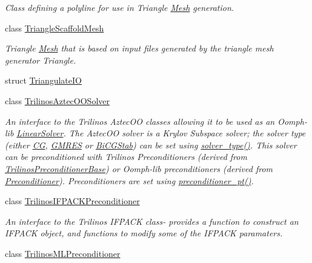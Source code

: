 \begin{DoxyCompactItemize}
\begin{DoxyCompactList}\small\item\em Class defining a polyline for use in Triangle \hyperlink{classoomph_1_1Mesh}{Mesh} generation. \end{DoxyCompactList}\item 
class \hyperlink{classoomph_1_1TriangleScaffoldMesh}{Triangle\+Scaffold\+Mesh}
\begin{DoxyCompactList}\small\item\em Triangle \hyperlink{classoomph_1_1Mesh}{Mesh} that is based on input files generated by the triangle mesh generator Triangle. \end{DoxyCompactList}\item 
struct \hyperlink{structoomph_1_1TriangulateIO}{Triangulate\+IO}
\item 
class \hyperlink{classoomph_1_1TrilinosAztecOOSolver}{Trilinos\+Aztec\+O\+O\+Solver}
\begin{DoxyCompactList}\small\item\em An interface to the Trilinos Aztec\+OO classes allowing it to be used as an Oomph-\/lib \hyperlink{classoomph_1_1LinearSolver}{Linear\+Solver}. The Aztec\+OO solver is a Krylov Subspace solver; the solver type (either \hyperlink{classoomph_1_1CG}{CG}, \hyperlink{classoomph_1_1GMRES}{G\+M\+R\+ES} or \hyperlink{classoomph_1_1BiCGStab}{Bi\+C\+G\+Stab}) can be set using \hyperlink{classoomph_1_1TrilinosAztecOOSolver_a9169831da7460eec52071e8b3938bf97}{solver\+\_\+type()}. This solver can be preconditioned with Trilinos Preconditioners (derived from \hyperlink{classoomph_1_1TrilinosPreconditionerBase}{Trilinos\+Preconditioner\+Base}) or Oomph-\/lib preconditioners (derived from \hyperlink{classoomph_1_1Preconditioner}{Preconditioner}). Preconditioners are set using \hyperlink{classoomph_1_1IterativeLinearSolver_a800f699ec8dda290105807cb91297850}{preconditioner\+\_\+pt()}. \end{DoxyCompactList}\item 
class \hyperlink{classoomph_1_1TrilinosIFPACKPreconditioner}{Trilinos\+I\+F\+P\+A\+C\+K\+Preconditioner}
\begin{DoxyCompactList}\small\item\em An interface to the Trilinos I\+F\+P\+A\+CK class-\/ provides a function to construct an I\+F\+P\+A\+CK object, and functions to modify some of the I\+F\+P\+A\+CK paramaters. \end{DoxyCompactList}\item 
class \hyperlink{classoomph_1_1TrilinosMLPreconditioner}{Trilinos\+M\+L\+Preconditioner}

\end{DoxyCompactItemize}
